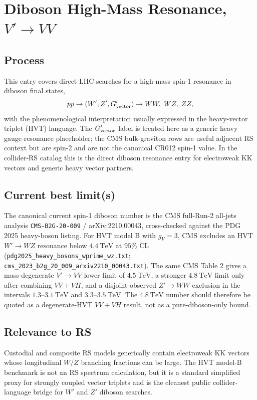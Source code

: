 
\section{\texorpdfstring{Diboson High-Mass Resonance, \(V'\to VV\)}{Diboson High-Mass Resonance, Vprime to VV}}

\subsection*{Process}
This entry covers direct LHC searches for a high-mass spin-1 resonance in
diboson final states,
\[
  pp\to (W',Z',G'_{\rm vector}) \to WW,\;WZ,\;ZZ,
\]
with the phenomenological interpretation usually expressed in the heavy-vector
triplet (HVT) language.  The \(G'_{\rm vector}\) label is treated here as a
generic heavy gauge-resonance placeholder; the CMS bulk-graviton rows are useful
adjacent RS context but are spin-2 and are not the canonical CR012 spin-1
value.  In the collider-RS catalog this is the direct diboson resonance entry
for electroweak KK vectors and generic heavy vector partners.

\subsection*{Current best limit(s)}
The canonical current spin-1 diboson number is the CMS full-Run-2 all-jets
analysis \texttt{CMS-B2G-20-009} / arXiv:2210.00043, cross-checked against the
PDG 2025 heavy-boson listing.  For HVT model B with \(g_V=3\), CMS excludes an
HVT \(W'\to WZ\) resonance below \(4.4~\mathrm{TeV}\) at \(95\%\) CL
(\texttt{pdg2025\_heavy\_bosons\_wprime\_wz.txt};
\texttt{cms\_2023\_b2g\_20\_009\_arxiv2210\_00043.txt}).  The same CMS Table 2
gives a mass-degenerate \(V'\to VV\) lower limit of \(4.5~\mathrm{TeV}\), a
stronger \(4.8~\mathrm{TeV}\) limit only after combining \(VV+VH\), and a
disjoint observed \(Z'\to WW\) exclusion in the intervals
\(1.3\)--\(3.1~\mathrm{TeV}\) and \(3.3\)--\(3.5~\mathrm{TeV}\).  The
\(4.8~\mathrm{TeV}\) number should therefore be quoted as a degenerate-HVT
\(VV+VH\) result, not as a pure-diboson-only bound.

\subsection*{Relevance to RS}
Custodial and composite RS models generically contain electroweak KK vectors
whose longitudinal \(W/Z\) branching fractions can be large.  The HVT model-B
benchmark is not an RS spectrum calculation, but it is a standard simplified
proxy for strongly coupled vector triplets and is the cleanest public
collider-language bridge for \(W'\) and \(Z'\) diboson searches.

